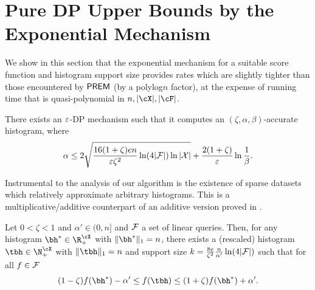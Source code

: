 \section{Pure DP Upper Bounds by the Exponential Mechanism}

\label{app:exponential_mechanism}

We show in this section that the exponential mechanism for a suitable score function and histogram support size provides rates which are slightly tighter than those encountered by $\mathsf{PREM}$ (by a polylog$n$ factor), at the expense of running time that is quasi-polynomial in $n,|\cX|,|\cF|$. 

\begin{theorem} \label{thm:Pure_DP_Upper_Bound}
There exists an $\varepsilon$-DP mechanism such that it computes an $(\zeta,\alpha,\beta)$-accurate histogram, where
\[ \alpha \leq 2\sqrt{\frac{16(1+\zeta)e n}{\varepsilon \zeta^2}\ln(4|{\cal F}|)\ln|{\cal X}|}+\frac{2(1+\zeta)}{\varepsilon}\ln\frac{1}{\beta}. \]
\end{theorem}

Instrumental to the analysis of our algorithm is the existence of sparse datasets which relatively approximate arbitrary histograms. This is a multiplicative/additive counterpart of an additive version proved in \citep{BlumLR13}.



\begin{proposition} \label{prop:existence_approx_histogram}
Let $0<\zeta<1$ and $\alpha'\in(0,n]$ and ${\cal F}$ a set of linear queries. Then, for any histogram $\bh^{\ast}\in\R_+^{\cX}$ with $\|\bh^{\ast}\|_1=n$, there exists a (rescaled) histogram $\tbh\in\N_+^{\cX}$ with $\|\tbh\|_1=n$ and support size 
$k=\frac{8e}{\zeta^2}\frac{n}{\alpha'}\ln(4|{\cal F}|)$ such that for all $f\in {\cal F}$
\begin{equation} \label{eqn:approx_multip}
(1-\zeta)f(\bh^{\ast}) - \alpha' \leq f(\tbh) \leq (1+\zeta) f(\bh^{\ast})+\alpha'.
\end{equation}
\end{proposition}


